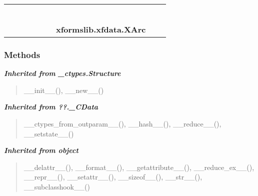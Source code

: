     \label{xformslib:xfdata:XArc}
\begin{tabular}{cccccccccc}
\multicolumn{2}{r}{\settowidth{\BCL}{object}\multirow{2}{\BCL}{object}}
&&
&&
&&
  \\\cline{3-3}
  &&\multicolumn{1}{c|}{}
&&
&&
&&
  \\
\multicolumn{4}{r}{\settowidth{\BCL}{??.\_CData}\multirow{2}{\BCL}{??.\_CData}}
&&
&&
  \\\cline{5-5}
  &&&&\multicolumn{1}{c|}{}
&&
&&
  \\
\multicolumn{6}{r}{\settowidth{\BCL}{\_ctypes.Structure}\multirow{2}{\BCL}{\_ctypes.Structure}}
&&
  \\\cline{7-7}
  &&&&&&\multicolumn{1}{c|}{}
&&
  \\
&&&&&&\multicolumn{2}{l}{\textbf{xformslib.xfdata.XArc}}
\end{tabular}



  \subsubsection{Methods}


\large{\textbf{\textit{Inherited from \_ctypes.Structure}}}

\begin{quote}
\_\_init\_\_(), \_\_new\_\_()
\end{quote}

\large{\textbf{\textit{Inherited from ??.\_CData}}}

\begin{quote}
\_\_ctypes\_from\_outparam\_\_(), \_\_hash\_\_(), \_\_reduce\_\_(), \_\_setstate\_\_()
\end{quote}

\large{\textbf{\textit{Inherited from object}}}

\begin{quote}
\_\_delattr\_\_(), \_\_format\_\_(), \_\_getattribute\_\_(), \_\_reduce\_ex\_\_(), \_\_repr\_\_(), \_\_setattr\_\_(), \_\_sizeof\_\_(), \_\_str\_\_(), \_\_subclasshook\_\_()
\end{quote}


